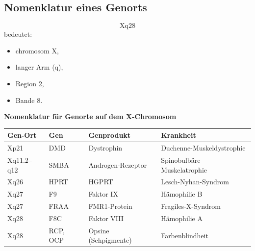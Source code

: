 
\subsection*{Nomenklatur eines Genorts}\label{subsec:nomenklatur-eines-genorts}

\begin{bsp}
    \[
        \mathrm{Xq28}
    \]
    bedeutet:
    \begin{itemize}
        \item \gls{chromosom} X,
        \item langer Arm (q),
        \item Region 2,
        \item Bande 8.
    \end{itemize}
\end{bsp}

\begin{bsp}
    \textbf{Nomenklatur für Genorte auf dem X-Chromosom}
    \begin{mytable}
        \begin{tabular}{|l|l|l|l|}
            \hline
            \textbf{Gen-Ort} & \textbf{Gen} & \textbf{Genprodukt}  & \textbf{Krankheit}          \\
            \hline
            Xp21             & DMD          & Dystrophin           & Duchenne-Muskeldystrophie   \\
            Xq11.2--q12      & SMBA         & Androgen-Rezeptor    & Spinobulbäre Muskelatrophie \\
            Xq26             & HPRT         & HGPRT                & Lesch-Nyhan-Syndrom         \\
            Xq27             & F9           & Faktor IX            & Hämophilie B                \\
            Xq27             & FRAA         & FMR1-Protein         & Fragiles-X-Syndrom          \\
            Xq28             & F8C          & Faktor VIII          & Hämophilie A                \\
            Xq28             & RCP, OCP     & Opsine (Sehpigmente) & Farbenblindheit             \\
            \hline
        \end{tabular}\label{tab:table9}
    \end{mytable}
\end{bsp}


